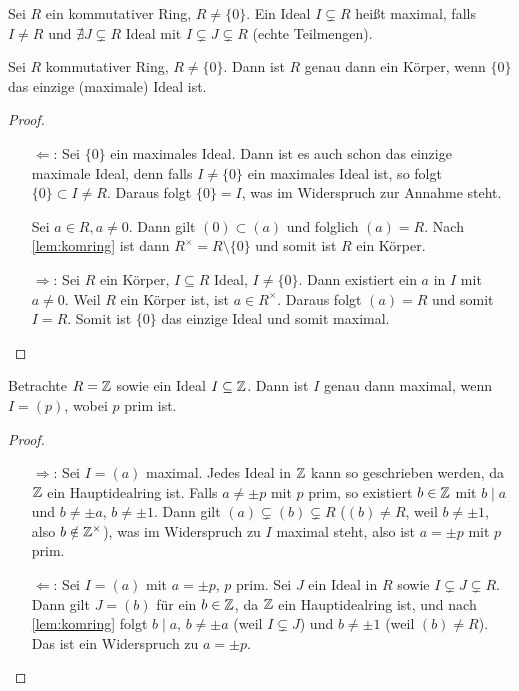 \documentclass[12pt,a4paper]{scrartcl}
\begin{document}
\begin{defi}
	Sei $R$ ein kommutativer Ring, $R\neq \{0\}$. Ein Ideal $I\subsetneq R$ heißt maximal, falls $I\neq R$ und $\nexists J\subsetneq R$ Ideal mit $I\subsetneq J\subsetneq R$ (echte Teilmengen).
\end{defi}
\begin{lem} \label{lem:field_0_max_ideal}
	Sei $R$ kommutativer Ring, $R\neq \{0\}$. Dann ist $R$ genau dann ein Körper, wenn $\lbrace 0 \rbrace$ das einzige \textup(maximale\textup) Ideal ist.
\end{lem}
\begin{proof}
	\leavevmode
	\begin{itemize}
		\item[\glqq $\Leftarrow$\grqq:] Sei $\{0\}$ ein maximales Ideal. Dann ist es auch schon das einzige maximale Ideal, denn falls $I\neq \{0\}$ ein maximales Ideal ist, so folgt $\{0\}\subset I\neq R$. Daraus folgt $\{0\} = I$, was im Widerspruch zur Annahme steht.
		
		Sei $a\in R, a\neq 0$. Dann gilt $(0) \subset (a)$ und folglich $(a) = R$. Nach \cref{lem:komring} ist dann $R^{\times} = R\setminus\{0\}$ und somit ist $R$ ein Körper.
		\item[\glqq $\Rightarrow$\grqq:] Sei $R$ ein Körper, $I\subseteq R$ Ideal, $I\neq \{0\}$. Dann existiert ein $a$ in $I$ mit $ a\neq 0$. Weil $R$ ein Körper ist, ist $a\in R^{\times}$. Daraus folgt $(a) = R$ und somit $I = R$. Somit ist $\{0\}$ das einzige Ideal und somit maximal.
  \qedhere
	\end{itemize}
\end{proof}

\begin{bsp} \label{bsp:IZ_max_ideal_klas}
	Betrachte $R = \mathbb Z$ sowie ein Ideal $I\subseteq \mathbb Z$. Dann ist $I$ genau dann maximal, wenn $I = (p)$, wobei $p$ prim ist.
	\begin{proof}
		\leavevmode
		\begin{itemize}
			\item[\glqq $\Rightarrow$\grqq:] Sei $I = (a)$ maximal. Jedes Ideal in $\mathbb Z$ kann so geschrieben werden, da $\mathbb Z$ ein Hauptidealring ist. Falls $a\neq \pm p$ mit $p$ prim, so existiert $b\in \mathbb Z$ mit $b\mid a$ und $b\neq \pm a$, $b\neq  \pm 1$.
			Dann gilt $(a)\subsetneq (b)\subsetneq R$ ($(b)\neq R$, weil $b\neq \pm 1$, also $b\notin \mathbb Z^{\times}$), was im Widerspruch zu $I$ maximal steht, also ist $a  = \pm p$ mit $p$ prim.
			
			\item[\glqq $\Leftarrow$\grqq:] Sei $I = (a)$ mit $a = \pm p$, $p$ prim. Sei $J$ ein Ideal in $R$ sowie $I \subsetneq J\subsetneq R$. Dann gilt $J = (b)$ für ein $b\in\mathbb Z$, da $\mathbb Z$ ein Hauptidealring ist, und nach \cref{lem:komring} folgt $b\mid a$, $b\neq \pm a$ (weil $I\subsetneq J$) und $b \neq \pm 1$ (weil $(b)\neq R$). Das ist ein Widerspruch zu $a = \pm p$.
    \qedhere
		\end{itemize}
	\end{proof}
\end{bsp}
\end{document}
